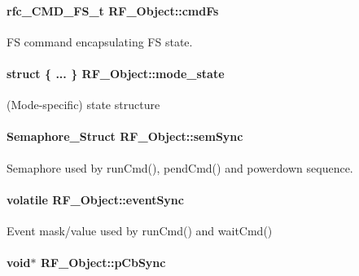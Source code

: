 \paragraph[{cmd\+Fs}]{\setlength{\rightskip}{0pt plus 5cm}rfc\+\_\+\+C\+M\+D\+\_\+\+F\+S\+\_\+t R\+F\+\_\+\+Object\+::cmd\+Fs}\label{struct_r_f___object_a48d422eefb97146c830e9b21970bc3a6}


F\+S command encapsulating F\+S state. 

\paragraph[{mode\+\_\+state}]{\setlength{\rightskip}{0pt plus 5cm}struct \{ ... \}   R\+F\+\_\+\+Object\+::mode\+\_\+state}\label{struct_r_f___object_a8201edc4d31d994d0218da2e8a0fcd5b}


(Mode-\/specific) state structure 

\paragraph[{sem\+Sync}]{\setlength{\rightskip}{0pt plus 5cm}Semaphore\+\_\+\+Struct R\+F\+\_\+\+Object\+::sem\+Sync}\label{struct_r_f___object_a2282dfef5c2e04522edfb61f9152628b}


Semaphore used by run\+Cmd(), pend\+Cmd() and powerdown sequence. 

\paragraph[{event\+Sync}]{ volatile R\+F\+\_\+\+Object\+::event\+Sync}\label{struct_r_f___object_a8379964e73b8969eb45fe49773eba235}


Event mask/value used by run\+Cmd() and wait\+Cmd() 

\paragraph[{p\+Cb\+Sync}]{\setlength{\rightskip}{0pt plus 5cm}void$\ast$ R\+F\+\_\+\+Object\+::p\+Cb\+Sync}\label{struct_r_f___object_ae3219bcfb65bacac26d30af83415863b}


